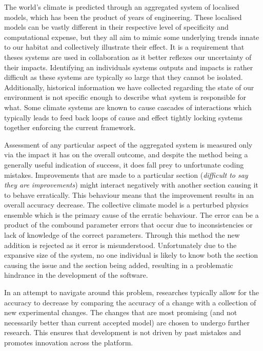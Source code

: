 \documentclass{ecmm427_assignment}
\begin{document}
\noindent The world's climate is predicted through an aggregated system of localised models, which has been the product of years of engineering. These localised models can be vastly different in their respective level of specificity and computational expense, but they all aim to mimic some underlying trends innate to our habitat and collectively illustrate their effect. It is a requirement that theses systems are used in collaboration as it better reflexes our uncertainty of their impacts. Identifying an individuals systems outputs and impacts is rather difficult as these systems are typically so large that they cannot be isolated. Additionally, historical information we have collected regarding the state of our environment is not specific enough to describe what system is responsible for what. Some climate systems are known to cause cascades of interactions which typically leads to feed back loops of cause and effect tightly locking systems together enforcing the current framework.

Assessment of any particular aspect of the aggregated system is measured only via the impact it has on the overall outcome, and despite the method being a generally useful indication of success, it does fall prey to unfortunate coding mistakes. Improvements that are made to a particular section (\textit{difficult to say they are improvements}) might interact negatively with another section causing it to behave erratically. This behaviour means that the improvement results in an overall accuracy decrease. The collective climate model is a perturbed physics ensemble which is the primary cause of the erratic behaviour. The error can be a product of the combound parameter errors that occur due to inconsistencies or lack of knowledge of the correct parameters. Through this method the new addition is rejected as it error is misunderstood. Unfortunately due to the expansive size of the system, no one individual is likely to know both the section causing the issue and the section being added, resulting in a problematic hindrance in the development of the software.

In an attempt to navigate around this problem, researches typically allow for the accuracy to decrease by comparing the accuracy of a change with a collection of new experimental changes. The changes that are most promising (and not necessarily better than current accepted model) are chosen to undergo further research. This ensures that development is not driven by past mistakes and promotes innovation across the platform.
\end{document}
